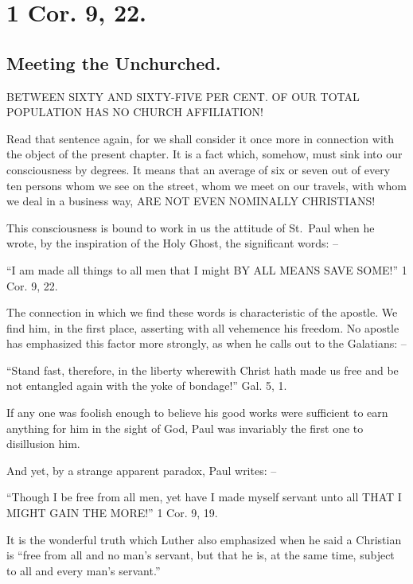 \documentclass[
]{book}
\begin{document}
\hypertarget{cor.-9-22.}{%
\section*{1 Cor. 9, 22.}\label{cor.-9-22.}}

\hypertarget{meeting-the-unchurched.}{%
\subsection*{Meeting the Unchurched.}\label{meeting-the-unchurched.}}

BETWEEN SIXTY AND SIXTY-FIVE PER CENT. OF OUR TOTAL POPULATION HAS NO CHURCH AFFILIATION!

Read that sentence again, for we shall consider it once more in connection with the object of the present chapter. It is a fact which, somehow, must sink into our consciousness by degrees. It means that an average of six or seven out of every ten persons whom we see on the street, whom we meet on our travels, with whom we deal in a business way, ARE NOT EVEN NOMINALLY CHRISTIANS!

This consciousness is bound to work in us the attitude of St.~Paul when he wrote, by the inspiration of the Holy Ghost, the significant words: --

``I am made all things to all men that I might BY ALL MEANS SAVE SOME!'' 1 Cor. 9, 22.

The connection in which we find these words is characteristic of the apostle. We find him, in the first place, asserting with all vehemence his freedom. No apostle has emphasized this factor more strongly, as when he calls out to the Galatians: --

``Stand fast, therefore, in the liberty wherewith Christ hath made us free and be not entangled again with the yoke of bondage!'' Gal. 5, 1.

If any one was foolish enough to believe his good works were sufficient to earn anything for him in the sight of God, Paul was invariably the first one to disillusion him.

And yet, by a strange apparent paradox, Paul writes: --

``Though I be free from all men, yet have I made myself servant unto all THAT I MIGHT GAIN THE MORE!'' 1 Cor. 9, 19.

It is the wonderful truth which Luther also emphasized when he said a Christian is ``free from all and no man's servant, but that he is, at the same time, subject to all and every man's servant.''
\end{document}
